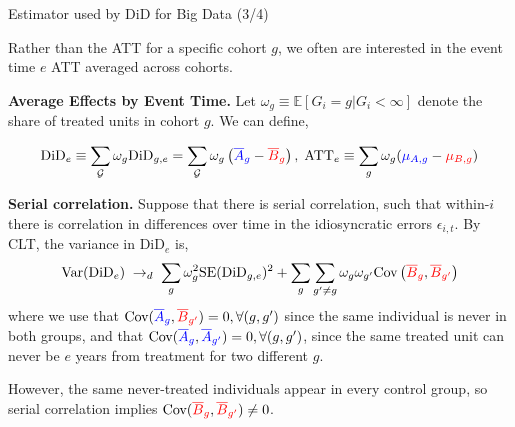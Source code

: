 \documentclass[usenames,dvipsnames]{beamer}
\begin{document}
\begin{frame}{Estimator used by DiD for Big Data (3/4)}

\vspace{-0.1cm}

Rather than the ATT for a specific cohort $g$, we often are interested in the event time $e$ ATT averaged across cohorts.

\textbf{Average Effects by Event Time.} Let  $\omega_g \equiv \mathbb{E}[G_i =g | G_i < \infty]$ denote the share of treated units in cohort $g$.  We can define,

\vspace{-0.5cm}

\begin{equation} \notag
\text{DiD}_e  \equiv   \sum_\mathcal{G} \omega_g \text{DiD}_{g,e} =  \sum_\mathcal{G} \omega_g \left(  {\color{blue}\overline{A}_g} - {\color{red}\overline{B}_g} \right), 
  \; \text{ATT}_e \equiv \sum_g   \omega_{g}  ( {\color{blue}\mu_{A,g}} - {\color{red}\mu_{B,g}} )
\end{equation} 

\vspace{-0.25cm}

\textbf{Serial correlation.} Suppose that there is serial correlation, such that within-$i$ there is correlation in differences over time in the idiosyncratic errors $\epsilon_{i,t}$. By CLT, the variance in $\text{DiD}_e$ is,
\begin{equation} \notag
\text{Var}(\text{DiD}_e) \; \rightarrow_d \; \sum_g \omega_g^2 \text{SE}(\text{DiD}_{g,e})^2   +
 \sum_g \sum_{g'\neq g} \omega_g \omega_{g'}
\text{Cov}\left(  {\color{red}\overline{B}_g}, {\color{red}\overline{B}_{g'}}   \right)
\end{equation}
where we use that $\text{Cov} (  {\color{blue}\overline{A}_g}, {\color{red}\overline{B}_{g'}} ) = 0, \forall(g,g')$ since the same individual is never in both groups, and that $\text{Cov} (  {\color{blue}\overline{A}_g}, {\color{blue}\overline{A}_{g'}} ) = 0, \forall(g,g')$, since the same treated unit can never be $e$ years from treatment for two different $g$.

However, the same never-treated individuals appear in every control group, so serial correlation implies  $\text{Cov} (  {\color{red}\overline{B}_g}, {\color{red}\overline{B}_{g'}}  ) \neq 0$.

\end{frame}
\end{document}
